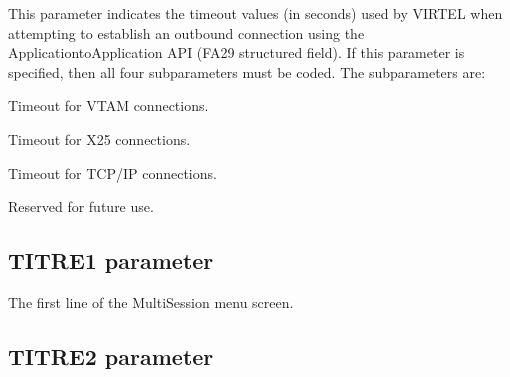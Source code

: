 \documentclass[letterpaper,10pt,english]{sphinxmanual}
\begin{document}
\sphinxAtStartPar
This parameter indicates the timeout values (in seconds) used by VIRTEL when attempting to establish an outbound connection using the Application\sphinxhyphen{}to\sphinxhyphen{}Application API (FA29 structured field). If this parameter is specified, then all four sub\sphinxhyphen{}parameters must be coded. The sub\sphinxhyphen{}parameters are:

\sphinxAtStartPar
{} \sphinxhyphen{} Timeout for VTAM connections.

\sphinxAtStartPar
{} \sphinxhyphen{} Timeout for X25 connections.

\sphinxAtStartPar
{} \sphinxhyphen{} Timeout for TCP/IP connections.

\sphinxAtStartPar
{} \sphinxhyphen{} Reserved for future use.

\ignorespaces 

\subsection{TITRE1 parameter}
\label{\detokenize{Installation_Guide:titre1-parameter}}\label{\detokenize{Installation_Guide:index-126}}
\begin{sphinxVerbatim}[commandchars=\\\{\}]
 
\end{sphinxVerbatim}

\sphinxAtStartPar
{} \sphinxhyphen{} The first line of the Multi\sphinxhyphen{}Session menu screen.


\subsection{TITRE2 parameter}
\label{\detokenize{Installation_Guide:titre2-parameter}}
\begin{sphinxVerbatim}[commandchars=\\\{\}]
 
\end{sphinxVerbatim}
\end{document}
